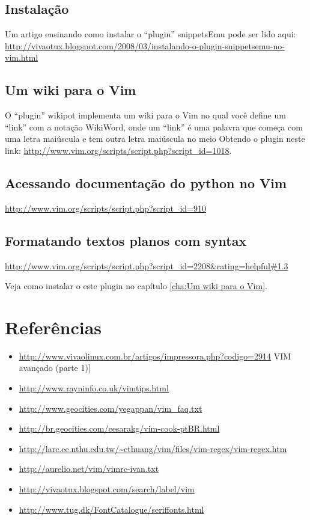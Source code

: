 \documentclass[10pt,a4paper,openany]{book}
\begin{document}
\section{Instalação}
\label{Instalação}

Um artigo ensinando como instalar o ``plugin'' snippetsEmu pode ser lido aqui:
 \url{http://vivaotux.blogspot.com/2008/03/instalando-o-plugin-snippetsemu-no-vim.html}

\section{Um wiki para o Vim}
\label{Um wiki para o Vim}

O ``plugin'' wikipot implementa um wiki para o Vim no qual você define
um ``link'' com a notação WikiWord, onde um ``link'' é uma palavra que
começa com uma letra maiúscula e tem outra letra maiúscula no meio
Obtendo o plugin neste link: \url{http://www.vim.org/scripts/script.php?script\_id=1018}.

\section{Acessando documentação do python no Vim}\label{Acessando documentação do python no Vim}

 \url{http://www.vim.org/scripts/script.php?script\_id=910}

\section{Formatando textos planos com syntax}
\label{Formatando textos planos com syntax}
\url{http://www.vim.org/scripts/script.php?script\_id=2208&rating=helpful#1.3}

Veja como instalar o este plugin no capítulo \ref{cha:Um wiki para o Vim}.

\chapter{Referências}
\begin{itemize}
\item \url{http://www.vivaolinux.com.br/artigos/impressora.php?codigo=2914} VIM avançado (parte 1)]
\item \url{http://www.rayninfo.co.uk/vimtips.html}
\item \url{http://www.geocities.com/yegappan/vim\_faq.txt}
\item \url{http://br.geocities.com/cesarakg/vim-cook-ptBR.html}
\item \url{http://larc.ee.nthu.edu.tw/~cthuang/vim/files/vim-regex/vim-regex.htm}
\item \url{http://aurelio.net/vim/vimrc-ivan.txt}
\item \url{http://vivaotux.blogspot.com/search/label/vim}
\item \url{http://www.tug.dk/FontCatalogue/seriffonts.html}
\end{itemize}
\end{document}
